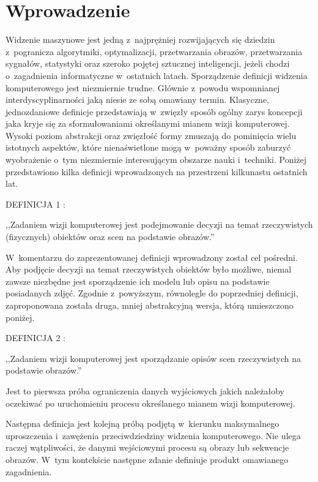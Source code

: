 \chapter{Wprowadzenie}

Widzenie maszynowe jest jedną z~najprężniej rozwijających się
dziedzin z~pogranicza algorytmiki, optymalizacji, przetwarzania obrazów,
przetwarzania sygnałów, statystyki oraz szeroko pojętej sztucznej
inteligencji, jeżeli chodzi o~zagadnienia informatyczne w~ostatnich
latach. Sporządzenie definicji widzenia komputerowego jest niezmiernie
trudne. Głównie z~powodu wspomnianej interdyscyplinarności
jaką niesie ze sobą omawiany termin. Klasyczne, jednozdaniowe
definicje przedstawiają w~zwięzły sposób ogólny zarys koncepcji
jaka kryje się za sformułowaniami określanymi mianem wizji komputerowej.
Wysoki poziom abstrakcji oraz zwięzłość formy zmuszają do pominięcia
wielu istotnych aspektów, które nienaświetlone mogą w~poważny sposób
zaburzyć wyobrażenie o~tym niezmiernie interesującym 
obszarze nauki i~techniki.  
Poniżej przedstawiono kilka definicji wprowadzonych na przestrzeni
kilkunastu ostatnich lat. 

DEFINICJA 1 \cite{ShapiroStockman200102}:

,,Zadaniem wizji komputerowej jest podejmowanie 
decyzji na temat rzeczywistych (fizycznych) obiektów
oraz scen na podstawie obrazów.''

W~komentarzu do zaprezentowanej definicji wprowadzony został
cel pośredni. Aby podjęcie decyzji na temat rzeczywistych obiektów
było możliwe, niemal zawsze niezbędne jest sporządzenie ich modelu lub 
opisu na podstawie posiadanych zdjęć. Zgodnie z~powyższym,
równolegle do poprzedniej definicji, zaproponowana została druga, mniej
abstrakcyjną wersja, którą umieszczono poniżej.

DEFINICJA 2 \cite{ShapiroStockman200102}:

,,Zadaniem wizji komputerowej jest sporządzanie
opisów scen rzeczywistych na podstawie obrazów.''

Jest to pierwsza próba ograniczenia danych wyjściowych jakich należałoby
oczekiwać po uruchomieniu procesu określanego mianem wizji komputerowej.

Następna definicja jest kolejną próbą
podjętą w~kierunku maksymalnego uproszczenia i~zawężenia
przeciwdziedziny widzenia komputerowego. Nie ulega raczej wątpliwości,
że danymi wejściowymi procesu są obrazy lub sekwencje obrazów.
W~tym kontekście następne zdanie definiuje produkt omawianego zagadnienia.

